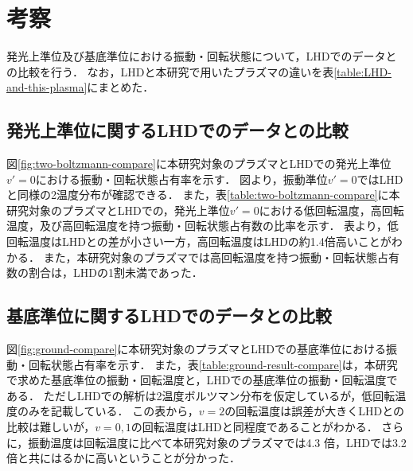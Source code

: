 \chapter{考察}
発光上準位及び基底準位における振動・回転状態について，LHDでのデータとの比較を行う．
なお，LHDと本研究で用いたプラズマの違いを表\ref{table:LHD-and-this-plasma}にまとめた\cite{ishihara}．

\section{発光上準位に関するLHDでのデータとの比較}
図\ref{fig:two-boltzmann-compare}に本研究対象のプラズマとLHDでの発光上準位$v'=0$における振動・回転状態占有率を示す．
図より，振動準位$v'=0$ではLHDと同様の2温度分布が確認できる．
また，表\ref{table:two-boltzmann-compare}に本研究対象のプラズマとLHDでの，発光上準位$v'=0$における低回転温度，高回転温度，及び高回転温度を持つ振動・回転状態占有数の比率を示す．
表より，低回転温度はLHDとの差が小さい一方，高回転温度はLHDの約1.4倍高いことがわかる．
また，本研究対象のプラズマでは高回転温度を持つ振動・回転状態占有数の割合は，LHDの1割未満であった．

\section{基底準位に関するLHDでのデータとの比較}
図\ref{fig:ground-compare}に本研究対象のプラズマとLHDでの基底準位における振動・回転状態占有率を示す．
また，表\ref{table:ground-result-compare}は，本研究で求めた基底準位の振動・回転温度と，LHDでの基底準位の振動・回転温度\cite{ishihara}である．
ただしLHDでの解析は2温度ボルツマン分布を仮定しているが，低回転温度のみを記載している．
この表から，$v=2$の回転温度は誤差が大きくLHDとの比較は難しいが，$v=0,1$の回転温度はLHDと同程度であることがわかる．
さらに，振動温度は回転温度に比べて本研究対象のプラズマでは4.3 倍，LHDでは3.2 倍と共にはるかに高いということが分かった．

